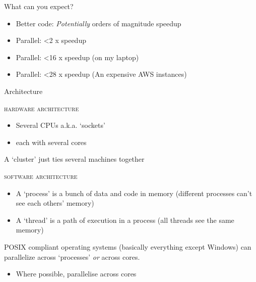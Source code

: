 \documentclass{hertieteaching}
\begin{document}
\begin{frame}[fragile]{What can you expect?}

\begin{itemize}
\item
  Better code: \emph{Potentially} orders of magnitude speedup
\item
  Parallel: \textless2 x speedup
\item
  Parallel: \textless16 x speedup (on my laptop)
\item
  Parallel: \textless28 x speedup (An expensive AWS instances)
\end{itemize}
\end{frame}

\begin{frame}{Architecture}

\textsc{hardware architecture}

\begin{itemize}
\item Several CPUs a.k.a. `sockets'
\item each with several cores
\end{itemize}

A `cluster' just ties several machines together

\pause

\textsc{software architecture}

\begin{itemize}
\item
  A `process' is a bunch of data and code in memory (different processes
  can't see each others' memory)
\item
  A `thread' is a path of execution in a process (all threads see the same memory)
\end{itemize}

POSIX compliant operating systems (basically everything except Windows)
can parallelize across `processes' \textit{or} across cores.
\begin{itemize}
  \item Where possible, parallelise across cores
\end{itemize}

\end{frame}
\end{document}
